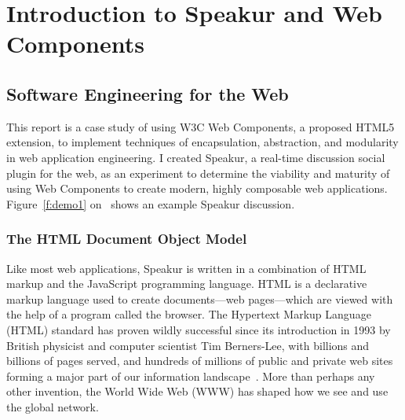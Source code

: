 \chapter{Introduction to Speakur and Web Components}
%
\label{ch:intro}

%
%

\section{Software Engineering for the Web}
This report is a case study of using W3C Web Components, 
a proposed HTML5 extension,
to implement techniques of encapsulation, abstraction, 
and modularity in web application engineering.
I created Speakur, a real-time discussion social plugin for the web, 
as an experiment to determine the viability and maturity of using Web Components to create modern, highly composable web applications. 
Figure~\ref{f:demo1} on~ shows an example Speakur discussion.

\subsection{The HTML Document Object Model}
Like most web applications, Speakur is written in a combination of HTML markup and the Java\-Script programming language. 
HTML is a declarative markup language used to create documents---web pages---which are viewed with the help of a program called the browser. 
The Hyper\-text Markup Language (HTML) 
standard has proven wildly successful since its introduction in 1993 by British physicist and computer scientist 
Tim Berners-Lee, 
with billions and billions of pages served, 
and hundreds of millions of public and private web sites forming a major part of our information landscape~\cite{internetlivestats.com2015}.
More than perhaps any other invention, the World Wide Web (WWW) has shaped how we see and use the global network.

